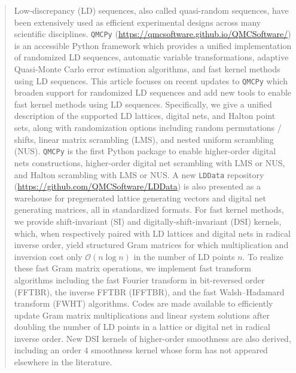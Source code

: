 \documentclass[acmsmall]{acmart}
\begin{document}
\begin{abstract}
    Low-discrepancy (LD) sequences, also called quasi-random sequences, have been extensively used as efficient experimental designs across many scientific disciplines. \texttt{QMCPy} (\url{https://qmcsoftware.github.io/QMCSoftware/}) is an accessible Python framework which provides a unified implementation of randomized LD sequences, automatic variable transformations, adaptive Quasi-Monte Carlo error estimation algorithms, and fast kernel methods using LD sequences. This article focuses on recent updates to \texttt{QMCPy} which broaden support for randomized LD sequences and add new tools to enable fast kernel methods using LD sequences. Specifically, we give a unified description of the supported LD lattices, digital nets, and Halton point sets, along with randomization options including random permutations / shifts, linear matrix scrambling (LMS), and nested uniform scrambling (NUS). \texttt{QMCPy} is the first Python package to enable higher-order digital nets constructions, higher-order digital net scrambling with LMS or NUS, and Halton scrambling with LMS or NUS. A new \texttt{LDData} repository (\url{https://github.com/QMCSoftware/LDData}) is also presented as a warehouse for pregenerated lattice generating vectors and digital net generating matrices, all in standardized formats. For fast kernel methods, we provide shift-invariant (SI) and digitally-shift-invariant (DSI) kernels, which, when respectively paired with LD lattices and digital nets in radical inverse order, yield structured Gram matrices for which multiplication and inversion cost only $\mathcal{O}(n \log n)$ in the number of LD points $n$. To realize these fast Gram matrix operations, we implement fast transform algorithms including the fast Fourier transform in bit-reversed order (FFTBR), the inverse FFTBR (IFFTBR), and the fast Walsh--Hadamard transform (FWHT) algorithms. Codes are made available to efficiently update Gram matrix multiplications and linear system solutions after doubling the number of LD points in a lattice or digital net in radical inverse order. New DSI kernels of higher-order smoothness are also derived, including an order $4$ smoothness kernel whose form has not appeared elsewhere in the literature. 
\end{abstract}
\end{document}
